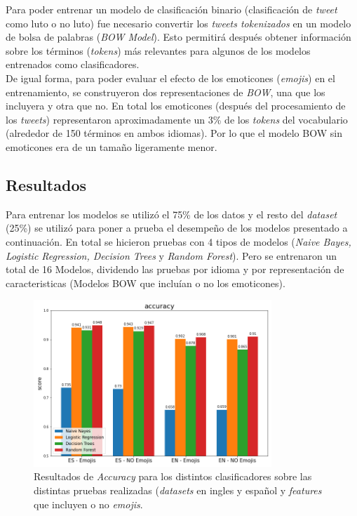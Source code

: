 Para poder entrenar un modelo de clasificación binario (clasificación de \textit{tweet} como luto o no luto) fue necesario convertir los \textit{tweets tokenizados} en un modelo de bolsa de palabras (\textit{BOW Model}). Esto permitirá después obtener información sobre los términos (\textit{tokens}) más relevantes para algunos de los modelos entrenados como clasificadores. \\

De igual forma, para poder evaluar el efecto de los emoticones (\textit{emojis}) en el entrenamiento, se construyeron dos representaciones de \textit{BOW}, una que los incluyera y otra que no. En total los emoticones (después del procesamiento de los \textit{tweets}) representaron aproximadamente un 3\% de los \textit{tokens} del vocabulario (alrededor de 150 términos en ambos idiomas). Por lo que el modelo BOW sin emoticones era de un tamaño ligeramente menor.

\subsection{Resultados}

Para entrenar los modelos se utilizó el 75\% de los datos y el resto del \textit{dataset} (25\%) se utilizó para poner a prueba el desempeño de los modelos presentado a continuación. En total se hicieron pruebas con 4 tipos de modelos (\textit{Naive Bayes, Logistic Regression, Decision Trees} y \textit{Random Forest}). Pero se entrenaron un total de 16 Modelos, dividendo las pruebas por idioma y por representación de caracteristicas (Modelos BOW que incluían o no los emoticones).

\begin{figure}[H]
    \centering
    \includegraphics[width=0.8\textwidth]{results/mourning_tweets_accuracy.png}
    \caption{Resultados de \textit{Accuracy} para los distintos clasificadores sobre las distintas pruebas realizadas (\textit{datasets} en ingles y español y \textit{features} que incluyen o no \textit{emojis}.}
    \label{fig:mt_acc}
\end{figure}


